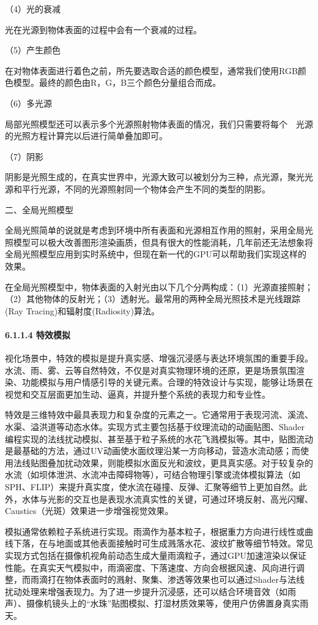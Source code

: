 （4）光的衰减

光在光源到物体表面的过程中会有一个衰减的过程。

（5）产生颜色

在对物体表面进行着色之前，所先要选取合适的颜色模型，通常我们使用RGB颜色模型。最终的颜色由R，G，B三个颜色分量组合而成。

（6）多光源

局部光照模型还可以表示多个光源照射物体表面的情况，我们只需要将每个　光源的光照方程计算完以后进行简单叠加即可。

（7）阴影

阴影是光照生成的，在真实世界中，光源大致可以被划分为三种，点光源，聚光光源和平行光源，不同的光源照射同一个物体会产生不同的类型的阴影。

二、全局光照模型

全局光照简单的说就是考虑到环境中所有表面和光源相互作用的照射，采用全局光照模型可以极大改善图形渲染画质，但具有很大的性能消耗，几年前还无法想象将全局光照模型应用到实时系统中，但现在新一代的GPU可以帮助我们实现这样的效果。

在全局光照模型中，物体表面的入射光由以下几个分两构成：（1）光源直接照射；（2）其他物体的反射光；（3）透射光。最常用的两种全局光照技术是光线跟踪(Ray Tracing)和辐射度(Radiosity)算法。

\paragraph{6.1.1.4 特效模拟}\label{ux7279ux6548ux6a21ux62df}

视化场景中，特效的模拟是提升真实感、增强沉浸感与表达环境氛围的重要手段。水流、雨、雾、云等自然特效，不仅是对真实物理环境的还原，更是场景氛围渲染、功能模拟与用户情感引导的关键元素。合理的特效设计与实现，能够让场景在视觉和交互层面更加生动、逼真，并提升整个系统的表现力和专业性。

特效是三维特效中最具表现力和复杂度的元素之一。它通常用于表现河流、溪流、水渠、溢洪道等动态水体。实现方式主要包括基于纹理流动的动画贴图、Shader编程实现的法线扰动模拟、甚至基于粒子系统的水花飞溅模拟等。其中，贴图流动是最基础的方法，通过UV动画使水面纹理沿某一方向移动，营造水流动感；而使用法线贴图叠加扰动效果，则能模拟水面反光和波纹，更具真实感。对于较复杂的水流（如坝体泄洪、水流冲击障碍物等），可结合物理引擎或流体模拟算法（如SPH、FLIP）来提升真实度，使水流在碰撞、反弹、汇聚等细节上更加自然。此外，水体与光影的交互也是表现水流真实性的关键，可通过环境反射、高光闪耀、Caustics（光斑）效果进一步增强视觉效果。

模拟通常依赖粒子系统进行实现。雨滴作为基本粒子，根据重力方向进行线性或曲线下落，在与地面或其他表面接触时可生成溅落水花、波纹扩散等细节特效。常见实现方式包括在摄像机视角前动态生成大量雨滴粒子，通过GPU加速渲染以保证性能。在真实天气模拟中，雨滴密度、下落速度、方向会根据风速、风向进行调整，而雨滴打在物体表面时的溅射、聚集、渗透等效果也可以通过Shader与法线扰动处理来增强表现力。为了进一步提升沉浸感，还可以结合环境音效（如雨声）、摄像机镜头上的``水珠''贴图模拟、打湿材质效果等，使用户仿佛置身真实雨天。

